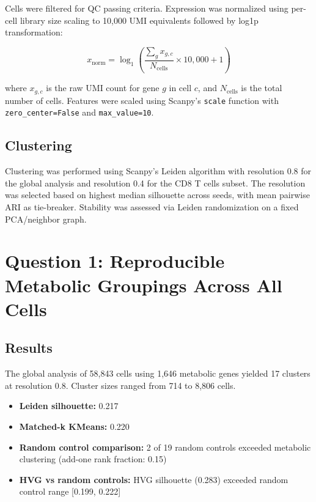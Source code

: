 \documentclass[11pt]{article}
\begin{document}
Cells were filtered for QC passing criteria. Expression was normalized using per-cell library size scaling to 10,000 UMI equivalents followed by log1p transformation:

\begin{equation}
    x_{\text{norm}} = \log_1\left( \frac{\sum_{g} x_{g,c}}{N_{\text{cells}}} \times 10,000 + 1 \right)
\end{equation}

where $x_{g,c}$ is the raw UMI count for gene $g$ in cell $c$, and $N_{\text{cells}}$ is the total number of cells. Features were scaled using Scanpy's \texttt{scale} function with \texttt{zero\_center=False} and \texttt{max\_value=10}.

\subsection{Clustering}

Clustering was performed using Scanpy's Leiden algorithm with resolution 0.8 for the global analysis and resolution 0.4 for the CD8 T cells subset. The resolution was selected based on highest median silhouette across seeds, with mean pairwise ARI as tie-breaker. Stability was assessed via Leiden randomization on a fixed PCA/neighbor graph.

\section{Question 1: Reproducible Metabolic Groupings Across All Cells}

\subsection{Results}

The global analysis of 58,843 cells using 1,646 metabolic genes yielded 17 clusters at resolution 0.8. Cluster sizes ranged from 714 to 8,806 cells.

\begin{itemize}
    \item \textbf{Leiden silhouette:} 0.217
    \item \textbf{Matched-k KMeans:} 0.220
    \item \textbf{Random control comparison:} 2 of 19 random controls exceeded metabolic clustering (add-one rank fraction: 0.15)
    \item \textbf{HVG vs random controls:} HVG silhouette (0.283) exceeded random control range [0.199, 0.222]
\end{itemize}
\end{document}
